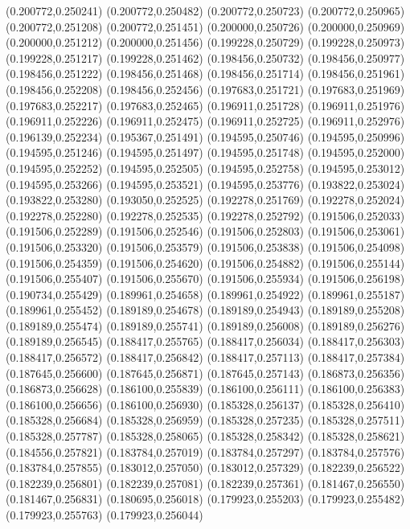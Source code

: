 (0.200772,0.250241)
(0.200772,0.250482)
(0.200772,0.250723)
(0.200772,0.250965)
(0.200772,0.251208)
(0.200772,0.251451)
(0.200000,0.250726)
(0.200000,0.250969)
(0.200000,0.251212)
(0.200000,0.251456)
(0.199228,0.250729)
(0.199228,0.250973)
(0.199228,0.251217)
(0.199228,0.251462)
(0.198456,0.250732)
(0.198456,0.250977)
(0.198456,0.251222)
(0.198456,0.251468)
(0.198456,0.251714)
(0.198456,0.251961)
(0.198456,0.252208)
(0.198456,0.252456)
(0.197683,0.251721)
(0.197683,0.251969)
(0.197683,0.252217)
(0.197683,0.252465)
(0.196911,0.251728)
(0.196911,0.251976)
(0.196911,0.252226)
(0.196911,0.252475)
(0.196911,0.252725)
(0.196911,0.252976)
(0.196139,0.252234)
(0.195367,0.251491)
(0.194595,0.250746)
(0.194595,0.250996)
(0.194595,0.251246)
(0.194595,0.251497)
(0.194595,0.251748)
(0.194595,0.252000)
(0.194595,0.252252)
(0.194595,0.252505)
(0.194595,0.252758)
(0.194595,0.253012)
(0.194595,0.253266)
(0.194595,0.253521)
(0.194595,0.253776)
(0.193822,0.253024)
(0.193822,0.253280)
(0.193050,0.252525)
(0.192278,0.251769)
(0.192278,0.252024)
(0.192278,0.252280)
(0.192278,0.252535)
(0.192278,0.252792)
(0.191506,0.252033)
(0.191506,0.252289)
(0.191506,0.252546)
(0.191506,0.252803)
(0.191506,0.253061)
(0.191506,0.253320)
(0.191506,0.253579)
(0.191506,0.253838)
(0.191506,0.254098)
(0.191506,0.254359)
(0.191506,0.254620)
(0.191506,0.254882)
(0.191506,0.255144)
(0.191506,0.255407)
(0.191506,0.255670)
(0.191506,0.255934)
(0.191506,0.256198)
(0.190734,0.255429)
(0.189961,0.254658)
(0.189961,0.254922)
(0.189961,0.255187)
(0.189961,0.255452)
(0.189189,0.254678)
(0.189189,0.254943)
(0.189189,0.255208)
(0.189189,0.255474)
(0.189189,0.255741)
(0.189189,0.256008)
(0.189189,0.256276)
(0.189189,0.256545)
(0.188417,0.255765)
(0.188417,0.256034)
(0.188417,0.256303)
(0.188417,0.256572)
(0.188417,0.256842)
(0.188417,0.257113)
(0.188417,0.257384)
(0.187645,0.256600)
(0.187645,0.256871)
(0.187645,0.257143)
(0.186873,0.256356)
(0.186873,0.256628)
(0.186100,0.255839)
(0.186100,0.256111)
(0.186100,0.256383)
(0.186100,0.256656)
(0.186100,0.256930)
(0.185328,0.256137)
(0.185328,0.256410)
(0.185328,0.256684)
(0.185328,0.256959)
(0.185328,0.257235)
(0.185328,0.257511)
(0.185328,0.257787)
(0.185328,0.258065)
(0.185328,0.258342)
(0.185328,0.258621)
(0.184556,0.257821)
(0.183784,0.257019)
(0.183784,0.257297)
(0.183784,0.257576)
(0.183784,0.257855)
(0.183012,0.257050)
(0.183012,0.257329)
(0.182239,0.256522)
(0.182239,0.256801)
(0.182239,0.257081)
(0.182239,0.257361)
(0.181467,0.256550)
(0.181467,0.256831)
(0.180695,0.256018)
(0.179923,0.255203)
(0.179923,0.255482)
(0.179923,0.255763)
(0.179923,0.256044)
